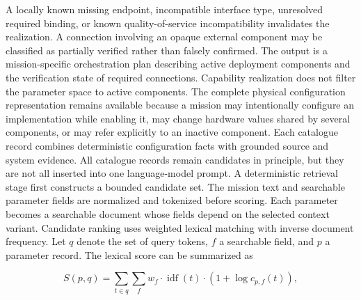 A locally known missing endpoint, incompatible interface type, unresolved required binding, or known quality-of-service incompatibility invalidates the realization. A connection involving an opaque external component may be classified as partially verified rather than falsely confirmed. The output is a mission-specific orchestration plan describing active deployment components and the verification state of required connections.
Capability realization does not filter the parameter space to active components. The complete physical configuration representation remains available because a mission may intentionally configure an implementation while enabling it, may change hardware values shared by several components, or may refer explicitly to an inactive component. Each catalogue record combines deterministic configuration facts with grounded source and system evidence.
All catalogue records remain candidates in principle, but they are not all inserted into one language-model prompt. A deterministic retrieval stage first constructs a bounded candidate set.
The mission text and searchable parameter fields are normalized and tokenized before scoring. Each parameter becomes a searchable document whose fields depend on the selected context variant.
Candidate ranking uses weighted lexical matching with inverse document frequency. Let $q$ denote the set of query tokens, $f$ a searchable field, and $p$ a parameter record. The lexical score can be summarized as

\begin{equation}
S(p,q)=\sum_{t \in q}\sum_f
w_f \cdot \operatorname{idf}(t) \cdot
\left(1+\log c_{p,f}(t)\right),
\end{equation}

